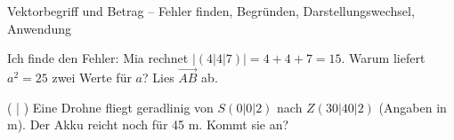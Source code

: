 \begin{aufgabe}{Vektorbegriff und Betrag – Fehler finden, Begründen, Darstellungswechsel, Anwendung}
\begin{teile}
\teil Ich finde den Fehler: Mia rechnet $|(4 | 4 | 7)| = 4 + 4 + 7 = 15$.
\teil Warum liefert $a^2 = 25$ zwei Werte für $a$?
\teil Lies $\overrightarrow{AB}$ ab.

\begin{ksys}[xmin=-1,xmax=5,ymin=-1,ymax=5,ablesen]   \end{ksys}
( \leerfeld | \leerfeld )
\teil Eine Drohne fliegt geradlinig von $S(0 | 0 | 2)$ nach $Z(30 | 40 | 2)$ (Angaben in m). Der Akku reicht noch für 45 m. Kommt sie an?
\end{teile}
\end{aufgabe}
